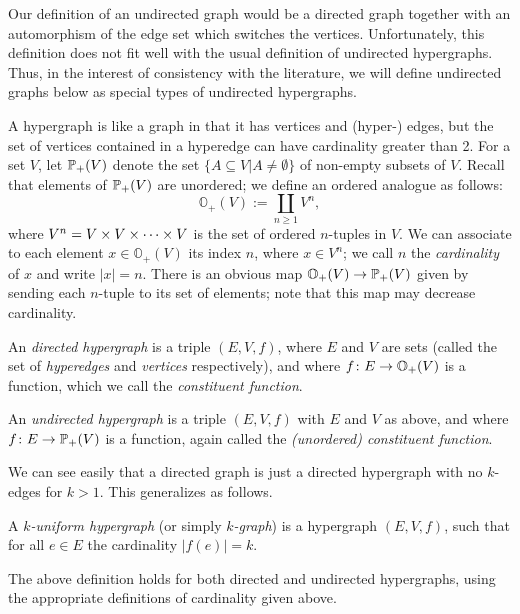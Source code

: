 \documentclass{amsart}
\def\ss{\subseteq}
\def\OO{{\mathbb O}}
\begin{document}
Our definition of an undirected graph would be a directed graph together with an automorphism of the edge set which switches the vertices.  Unfortunately, this definition does not fit well with the usual definition of undirected hypergraphs.  Thus, in the interest of consistency with the literature, we will define undirected graphs below as special types of undirected hypergraphs.

A hypergraph is like a graph in that it has vertices and (hyper-) edges, but the set of vertices contained in a hyperedge can have cardinality greater than 2.  For a set $V$, let ${\mathbb P}_+(V)$ denote the set $\{A\ss V|A\neq\emptyset\}$ of non-empty subsets of $V$.  Recall that elements of ${\mathbb P}_+(V)$ are unordered; we define an ordered analogue as follows: $$\OO_+(V):=\coprod_{n\geq 1} V^n,$$ where $V^n=V\times V\times\cdots\times V$ is the set of ordered $n$-tuples in $V$.  We can associate to each element $x\in\OO_+(V)$ its index $n$, where $x\in V^n$; we call $n$ the {\em cardinality} of $x$ and write $|x|=n$. There is an obvious map $\OO_+(V)\to\PP_+(V)$ given by sending each $n$-tuple to its set of elements; note that this map may decrease cardinality.   

\begin{definition}

An {\em directed hypergraph} is a triple $(E,V,f)$, where $E$ and $V$ are sets (called the set of {\em hyperedges} and {\em vertices} respectively), and where $f\taking E\to\OO_+(V)$ is a function, which we call the {\em constituent function}.

An {\em undirected hypergraph} is a triple $(E,V,f)$ with $E$ and $V$ as above, and where $f\colon E\rightarrow{\mathbb P}_+(V)$ is a function, again called the {\em (unordered) constituent function}.

\end{definition}

We can see easily that a directed graph is just a directed hypergraph with no $k$-edges for $k>1$.  This generalizes as follows. 

\begin{definition}

A {\em $k$-uniform hypergraph} (or simply {\em $k$-graph}) is a hypergraph $(E,V,f)$, such that for all $e\in E$ the cardinality $|f(e)|=k$. 

\end{definition}

The above definition holds for both directed and undirected hypergraphs, using the appropriate definitions of cardinality given above.
\end{document}
